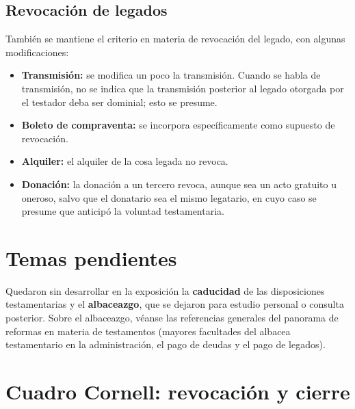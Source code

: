 \documentclass[12pt,oneside]{book}
\begin{document}
\subsection{Revocación de legados}

También se mantiene el criterio en materia de revocación del legado, con algunas modificaciones:

\begin{itemize}
    \item \textbf{Transmisión:} se modifica un poco la transmisión. Cuando se habla de transmisión, no se indica que la transmisión posterior al legado otorgada por el testador deba ser dominial; esto se presume.
    \item \textbf{Boleto de compraventa:} se incorpora específicamente como supuesto de revocación.
    \item \textbf{Alquiler:} el alquiler de la cosa legada no revoca.
    \item \textbf{Donación:} la donación a un tercero revoca, aunque sea un acto gratuito u oneroso, salvo que el donatario sea el mismo legatario, en cuyo caso se presume que anticipó la voluntad testamentaria.
\end{itemize}

\section{Temas pendientes}

Quedaron sin desarrollar en la exposición la \textbf{caducidad} de las disposiciones testamentarias y el \textbf{albaceazgo}, que se dejaron para estudio personal o consulta posterior. Sobre el albaceazgo, véanse las referencias generales del panorama de reformas en materia de testamentos (mayores facultades del albacea testamentario en la administración, el pago de deudas y el pago de legados).

\section{Cuadro Cornell: revocación y cierre}
\end{document}
